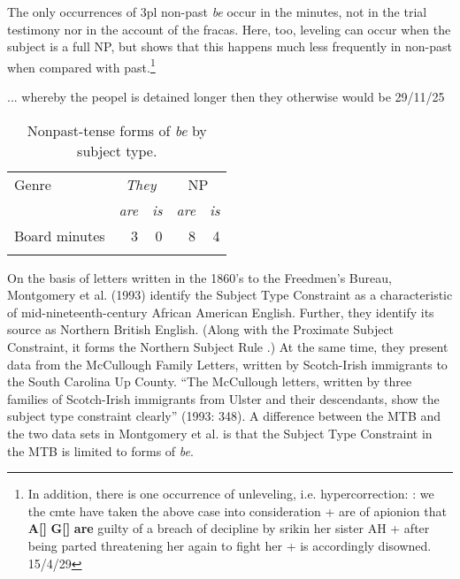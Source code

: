 \documentclass[output=paper,colorlinks,citecolor=brown]{langscibook}
\begin{document}
The only occurrences of 3pl non-past \textit{be} occur in the minutes, not in the trial testimony nor in the account of the fracas. Here, too, leveling can occur  when the subject is a full NP, but  shows that this happens much less frequently in non-past when compared with past.\footnote{{In addition, there is one occurrence of unleveling, i.e. hypercorrection: :} {we the cmte have taken the above case into consideration + are of apionion that} {\textbf{A[]} \textbf{G[]} \textbf{are}} {guilty of a breach of decipline by srikin her sister AH + after being parted threatening her again to fight her + is accordingly disowned. 15/4/29}}

\ea%
\label{ex:singler:13}
 ... whereby the peopel is detained longer then they otherwise would be 29/11/25 \\
\z

\begin{table}
\caption{Nonpast-tense forms of \textit{be} by subject type.\label{tab:4 singler:4}}
\begin{tabular}{lrrrr}
\lsptoprule
Genre & \multicolumn{2}{c}{ \textit{They}} & \multicolumn{2}{c}{NP}\\\cmidrule(lr){2-3}\cmidrule(lr){4-5}
& \textit{are} & \textit{is} & \textit{are} & \textit{is}\\
\midrule
Board minutes & 3 & 0 & 8 & 4\\
\lspbottomrule
\end{tabular}
\end{table}

\begin{sloppypar}
On the basis of letters written in the 1860’s to the Freedmen’s Bureau, Montgomery et al. (1993) identify the Subject Type Constraint as a characteristic of mid-nineteenth-century African American English. Further, they identify its source as Northern British English. (Along with the Proximate Subject Constraint, it forms the Northern Subject Rule \citep{Murray1873}.) At the same time, they present data from the McCullough Family Letters, written by Scotch-Irish immigrants to the South Carolina Up County. “The McCullough letters, written by three families of Scotch-Irish immigrants from Ulster and their descendants, show the subject type constraint clearly” (1993: 348). A difference between the MTB and the two data sets in Montgomery et al. is that the Subject Type Constraint in the MTB is limited to forms of \textit{be}. 
\end{sloppypar}
\end{document}
